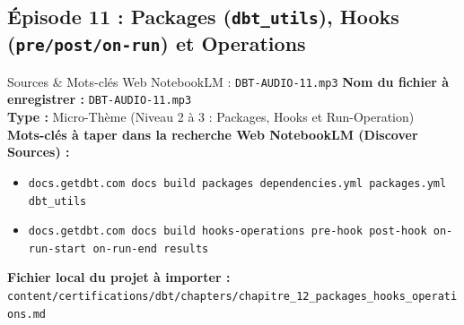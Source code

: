 \documentclass[11pt,a4paper]{article}
\begin{document}
\subsection{Épisode 11 : Packages (\texttt{dbt\_utils}), Hooks (\texttt{pre/post/on-run}) et Operations}
\begin{sourcebox}{Sources \& Mots-clés Web NotebookLM : \texttt{DBT-AUDIO-11.mp3}}
\textbf{Nom du fichier à enregistrer :} \texttt{DBT-AUDIO-11.mp3}\\
\textbf{Type :} Micro-Thème (Niveau 2 à 3 : Packages, Hooks et Run-Operation)\\
\textbf{Mots-clés à taper dans la recherche Web NotebookLM (Discover Sources) :}
\begin{itemize}[noitemsep]
    \item \texttt{docs.getdbt.com docs build packages dependencies.yml packages.yml dbt_utils}
    \item \texttt{docs.getdbt.com docs build hooks-operations pre-hook post-hook on-run-start on-run-end results}
\end{itemize}
\textbf{Fichier local du projet à importer :}
\texttt{content/certifications/dbt/chapters/chapitre_12_packages_hooks_operations.md}
\end{sourcebox}
\end{document}
